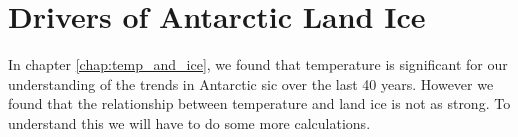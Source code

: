 \documentclass[../main.tex]{subfiles}
\begin{document}
\chapter{Drivers of Antarctic Land Ice}
\label{chap:land_ice}
In chapter \ref{chap:temp_and_ice}, we found that temperature is significant for our understanding of the trends in Antarctic \gls{sic} over the last 40 years. However we found that the relationship between temperature and land ice is not as strong. To understand this we will have to do some more calculations.
\end{document}
